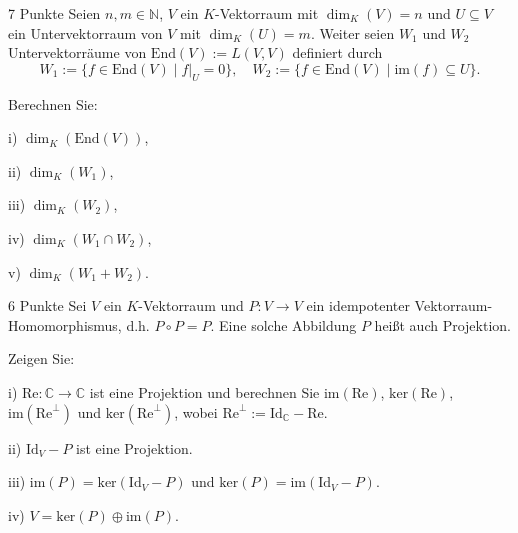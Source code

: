 \documentclass{../problemset}
\begin{document}
\begin{problem}{7 Punkte}
Seien $n, m \in \mathbb{N}$, $V$ ein $K$-Vektorraum mit $\dim_K(V) = n$ und $U \subseteq V$ ein Untervektorraum von $V$ mit $\dim_K(U) = m$. Weiter seien $W_1$ und $W_2$ Untervektorräume von $\text{End}(V) := L(V, V)$ definiert durch
\[ W_1 := \{f \in \text{End}(V) \mid f|_U = 0\}, \quad W_2 := \{f \in \text{End}(V) \mid \text{im}(f) \subseteq U\}. \]

Berechnen Sie:

i) $\dim_K(\text{End}(V))$,

ii) $\dim_K(W_1)$,

iii) $\dim_K(W_2)$,

iv) $\dim_K(W_1 \cap W_2)$,

v) $\dim_K(W_1 + W_2)$.
\end{problem}

\begin{problem}[Projektionen]{6 Punkte}
Sei $V$ ein $K$-Vektorraum und $P : V \rightarrow V$ ein idempotenter Vektorraum-Homomorphismus, d.h. $P \circ P = P$. Eine solche Abbildung $P$ heißt auch Projektion.

Zeigen Sie:

i) $\text{Re} : \mathbb{C} \rightarrow \mathbb{C}$ ist eine Projektion und berechnen Sie $\text{im}(\text{Re})$, $\text{ker}(\text{Re})$, $\text{im}(\text{Re}^\perp)$ und $\text{ker}(\text{Re}^\perp)$, wobei $\text{Re}^\perp := \text{Id}_\mathbb{C} - \text{Re}$.

ii) $\text{Id}_V - P$ ist eine Projektion.

iii) $\text{im}(P) = \text{ker}(\text{Id}_V - P)$ und $\text{ker}(P) = \text{im}(\text{Id}_V - P)$.

iv) $V = \text{ker}(P) \oplus \text{im}(P)$.
\end{problem}
\end{document}
